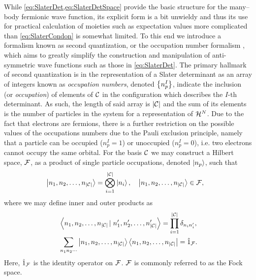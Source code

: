 While \cref{eq:SlaterDet,eq:SlaterDetSpace} provide the basic structure for the many--body fermionic wave function, its explicit form
is a bit unwieldy and thus its use for practical calculation of moieties such as expectation values more complicated than \cref{eq:SlaterCondon} 
is somewhat limited.
To this end we introduce a formalism known as second quantization, or the occupation number formalism \cite{Walecka12_book,Schuck04_book,Ostlund12_book},
which aims to greatly simplify the construction and manipulation of anti-symmetric wave functions such as those in 
\cref{eq:SlaterDet}. The primary hallmark of second quantization is in the representation of a Slater determinant
as an array of integers known as \emph{occupation numbers}, denoted $\left \lbrace n_p^I \right\rbrace$, indicate the inclusion (or \emph{occupation}) of elements
of $\mathcal{C}$ in the configuration which describes the $I$-th determinant. As such, the length of said array is $\vert \mathcal{C} \vert$
and the sum of its elements is the number of particles in the system for a representation of $\mathcal{H}^N$. Due to the fact that electrons are fermions,
there is a further restriction on the possible values of the occupations numbers due to the Pauli exclusion principle,
namely that a particle can be occupied ($n^I_p=1$) or unoccupied ($n^I_p=0$), i.e. two electrons cannot occupy the same orbital. 
For the basis $\mathcal{C}$ we may construct a Hilbert space, $\mathcal{F}$, as a product of single particle occupations, denoted $\left\vert n_p \right\rangle$, such that \cite{Walecka12_book}
\begin{align}
&\left\vert n_1,n_2,\ldots,n_{\vert\mathcal{C}\vert} \right\rangle = \bigotimes_{i=1}^{\vert \mathcal{C} \vert} \left\vert n_i \right\rangle, 
  \quad \left\vert n_1,n_2,\ldots,n_{\vert\mathcal{C}\vert} \right\rangle \in \mathcal{F},
\end{align}
where we may define inner and outer products as
\begin{subequations}
  \label{eq:OccOrthoComp}
\begin{align}
&\left\langle n_1,n_2,\ldots,n_{\vert\mathcal{C}\vert} \left\vert\right. n'_1,n'_2,\ldots,n'_{\vert\mathcal{C}\vert} \right\rangle = \prod_{i = 1}^{\vert\mathcal{C}\vert} \delta_{n_i n_i'},\\
&\sum_{n_1n_2\cdots} \left\vert n_1,n_2,\ldots,n_{\vert\mathcal{C}\vert} \right\rangle\left\langle n_1,n_2,\ldots,n_{\vert\mathcal{C}\vert} \right\vert = \hat{1}_{\mathcal{F}}.
\end{align}
\end{subequations}
Here, $\hat{1}_{\mathcal{F}}$ is the identity operator on $\mathcal{F}$. $\mathcal{F}$ is commonly referred to as the Fock space.

